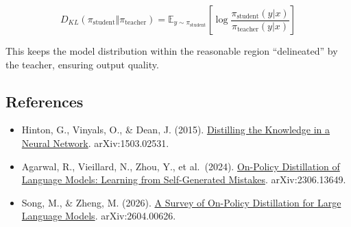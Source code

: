\[
D_{KL}(\pi_{\mathrm{student}} \Vert \pi_{\mathrm{teacher}}) = \mathbb{E}_{y \sim \pi_{\mathrm{student}}}\left[\log \frac{\pi_{\mathrm{student}}(y|x)}{\pi_{\mathrm{teacher}}(y|x)}\right]
\]

This keeps the model distribution within the reasonable region ``delineated'' by the teacher, ensuring output quality.

\FloatBarrier
{}
\hypertarget{references-89}{%
\subsection{References}\label{references-89}}

\vspace{0.25em}
\begin{itemize}
\tightlist
\item
  Hinton, G., Vinyals, O., \& Dean, J. (2015). \href{https://arxiv.org/abs/1503.02531}{Distilling the Knowledge in a Neural Network}. arXiv:1503.02531.
\item
  Agarwal, R., Vieillard, N., Zhou, Y., et al.~(2024). \href{https://arxiv.org/abs/2306.13649}{On-Policy Distillation of Language Models: Learning from Self-Generated Mistakes}. arXiv:2306.13649.
\item
  Song, M., \& Zheng, M. (2026). \href{https://arxiv.org/abs/2604.00626}{A Survey of On-Policy Distillation for Large Language Models}. arXiv:2604.00626.
\end{itemize}

\clearpage
